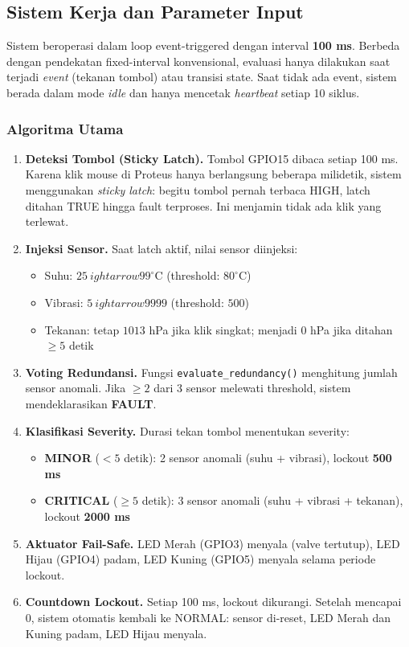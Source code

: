 \documentclass[12pt,a4paper]{article}
\begin{document}
\newpage

\subsection{Sistem Kerja dan Parameter Input}

Sistem beroperasi dalam loop event-triggered dengan interval \textbf{100 ms}. Berbeda dengan pendekatan fixed-interval konvensional, evaluasi hanya dilakukan saat terjadi \textit{event} (tekanan tombol) atau transisi state. Saat tidak ada event, sistem berada dalam mode \textit{idle} dan hanya mencetak \textit{heartbeat} setiap 10 siklus.

\subsubsection*{Algoritma Utama}

\begin{enumerate}
  \item \textbf{Deteksi Tombol (Sticky Latch).} Tombol GPIO15 dibaca setiap 100 ms. Karena klik mouse di Proteus hanya berlangsung beberapa milidetik, sistem menggunakan \textit{sticky latch}: begitu tombol pernah terbaca HIGH, latch ditahan TRUE hingga fault terproses. Ini menjamin tidak ada klik yang terlewat.
  \item \textbf{Injeksi Sensor.} Saat latch aktif, nilai sensor diinjeksi:
    \begin{itemize}
      \item Suhu: $25 \
ightarrow 99^\circ$C (threshold: $80^\circ$C)
      \item Vibrasi: $5 \
ightarrow 9999$ (threshold: $500$)
      \item Tekanan: tetap $1013$ hPa jika klik singkat; menjadi $0$ hPa jika ditahan $\geq 5$ detik
    \end{itemize}
  \item \textbf{Voting Redundansi.} Fungsi \texttt{evaluate\_redundancy()} menghitung jumlah sensor anomali. Jika $\geq 2$ dari 3 sensor melewati threshold, sistem mendeklarasikan \textbf{FAULT}.
  \item \textbf{Klasifikasi Severity.} Durasi tekan tombol menentukan severity:
    \begin{itemize}
      \item \textbf{MINOR} ($<5$ detik): 2 sensor anomali (suhu + vibrasi), lockout \textbf{500 ms}
      \item \textbf{CRITICAL} ($\geq 5$ detik): 3 sensor anomali (suhu + vibrasi + tekanan), lockout \textbf{2000 ms}
    \end{itemize}
  \item \textbf{Aktuator Fail-Safe.} LED Merah (GPIO3) menyala (valve tertutup), LED Hijau (GPIO4) padam, LED Kuning (GPIO5) menyala selama periode lockout.
  \item \textbf{Countdown Lockout.} Setiap 100 ms, lockout dikurangi. Setelah mencapai 0, sistem otomatis kembali ke NORMAL: sensor di-reset, LED Merah dan Kuning padam, LED Hijau menyala.
\end{enumerate}
\end{document}
